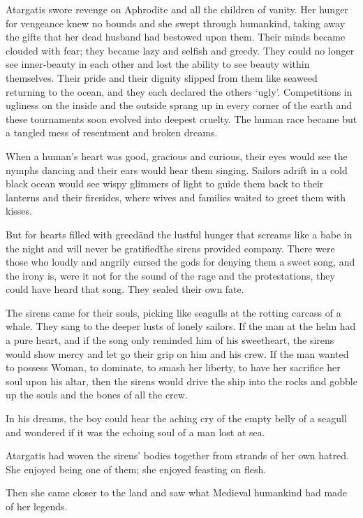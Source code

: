 Atargatis swore revenge on Aphrodite and all the children of
vanity. Her hunger for vengeance knew no bounds and she swept through
humankind, taking away the gifts that her dead husband had bestowed
upon them. %
Their minds became clouded with fear; they became lazy and
selfish and greedy. They could no longer see inner-beauty in each
other and lost the ability to see beauty within themselves. Their
pride and their dignity slipped from them like seaweed returning to
the ocean, and they each declared the others ‘ugly’. Competitions in
ugliness on the inside and the outside sprang up in every corner of
the earth and these tournaments soon evolved into deepest cruelty. The
human race became but a tangled mess of resentment and broken dreams.

When a human’s heart was good, gracious and curious, their eyes would
see the nymphs dancing and their ears would hear them singing. Sailors
adrift in a cold black ocean would see wispy glimmers of light to
guide them back to their lanterns and their firesides, where wives and
families waited to greet them with kisses.

But for hearts filled with greed\=and the lustful hunger that screams
like a babe in the night and will never be gratified\=the sirens
provided company. There were those who loudly and angrily cursed the
gods for denying them a sweet song, and the irony is, were it not for
the sound of the rage and the protestations, they could have heard
that song. They sealed their own fate.

The sirens came for their souls, picking like seagulls at the rotting
carcass of a whale. They sang to the deeper lusts of lonely
sailors. If the man at the helm had a pure heart, and if the song only
reminded him of his sweetheart, the sirens would show mercy and let go
their grip on him and his crew. If the man wanted to possess Woman, to
dominate, to smash her liberty, to have her sacrifice her soul upon
his altar, then the sirens would drive the ship into the rocks and
gobble up the souls and the bones of all the crew.

In his dreams, the boy could hear the aching cry of the empty belly of
a seagull and wondered if it was the echoing soul of a man lost at
sea.

Atargatis had woven the sirens’ bodies together from strands of her
own hatred. She enjoyed being one of them; she enjoyed feasting on
flesh.

Then she came closer to the land and saw what Medieval humankind had
made of her legends.

